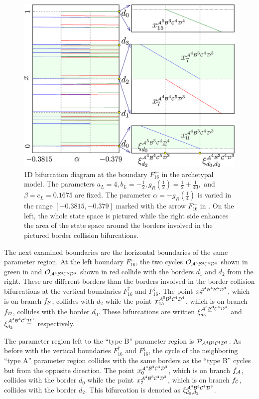 \begin{figure}
	\centering
	\includegraphics[width=.7 \textwidth]{../Figures/6/6.6/result.png}
	\caption[1D bifurcation diagram at the boundary $F_{16}^\leftarrow$ in the archetypal model]{
		1D bifurcation diagram at the boundary $F_{16}^\leftarrow$ in the archetypal model.
		The parameters $a_L = 4, b_L = -\frac{1}{2}, g_R\left(\frac{1}{2}\right) = \frac{1}{2} + \frac{1}{40},$ and $\beta = c_L = 0.1675$ are fixed.
		The parameter $\alpha = -g_R\left(\frac{1}{4}\right)$ is varied in the range $[-0.3815, -0.379]$ marked with the arrow $F_{16}^\leftarrow$ in .
		On the left, the whole state space is pictured while the right side enhances the area of the state space around the borders involved in the pictured border collision bifurcations.
	}
	\label{fig:arch.bif.F.left}
\end{figure}

The next examined boundaries are the horizontal boundaries of the same parameter region.
At the left boundary $F_{16}^\leftarrow$, the two cycles $\mathcal{O}_{\mathcal{A}^5\mathcal{B}^3\mathcal{C}^4\mathcal{D}^4}$ shown in green in  and $\mathcal{O}_{\mathcal{A}^4\mathcal{B}^4\mathcal{C}^5\mathcal{D}^3}$ shown in red collide with the borders $d_1$ and $d_2$ from the right.
These are different borders than the borders involved in the border collision bifurcations at the vertical boundaries $F_{16}^\uparrow$ and $F_{16}^\downarrow$.
The point $x_{7}^{\mathcal{A}^4\mathcal{B}^4\mathcal{B}^5\mathcal{D}^3}$, which is on branch $f_{\mathcal{B}}$, collides with $d_2$ while the point $x_{15}^{\mathcal{A}^5\mathcal{B}^3\mathcal{C}^4\mathcal{D}^4}$, which is on branch $f_{\mathcal{D}}$, collides with the border $d_0$.
These bifurcations are written $\xi_{d_0}^{\mathcal{A}^5\underline{\mathcal{B}}^3\mathcal{C}^4\mathcal{D}^4}$ and $\xi_{d_2}^{\mathcal{A}^4\mathcal{B}^4\mathcal{C}^5\underline{\mathcal{D}}^3}$ respectively.

The parameter region left to the ``type B'' parameter region is $\mathcal{P}_{\mathcal{A}^4\mathcal{B}^3\mathcal{C}^4\mathcal{D}^3}$.
As before with the vertical boundaries $F_{16}^\uparrow$ and $F_{16}^\downarrow$, the cycle of the neighboring ``type A'' parameter region collides with the same borders as the ``type B'' cycles but from the opposite direction.
The point $x_{0}^{\mathcal{A}^4\mathcal{B}^3\mathcal{C}^4\mathcal{D}^3}$, which is on branch $f_{\mathcal{A}}$, collides with the border $d_0$ while the point $x_{7}^{\mathcal{A}^4\mathcal{B}^3\mathcal{C}^4\mathcal{D}^3}$, which is on branch $f_{\mathcal{C}}$, collides with the border $d_2$.
This bifurcation is denoted as $\xi_{d_0, d_2}^{\mathcal{A}^4\mathcal{B}^3\mathcal{C}^4\mathcal{D}^3}$.

